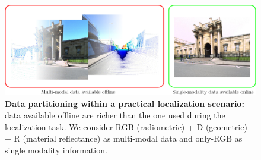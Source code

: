 \begin{figure}
	\centering
		
	\includegraphics[width=\linewidth]{introduction/data_setup}

	\caption[Data partitioning]{\label{fig:data_setup} \textbf{Data partitioning within a practical localization scenario:} data available offline are richer than the one used during the localization task. We consider RGB (radiometric) + D (geometric) + R (material reflectance) as multi-modal data and only-RGB as single modality information.}
	
\end{figure}
	